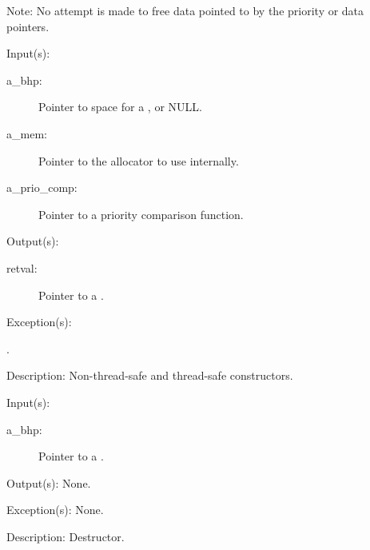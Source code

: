 \begin{capi}
\begin{capilist}
		Note: No attempt is made to free data pointed to by the priority
		or data pointers.
	\end{capilist}
\label{bhp_new}
\label{bhp_new_r}
	\begin{capilist}
	\item[Input(s): ]
		\begin{description}\item[]
		\item[a\_bhp: ]
			Pointer to space for a , or NULL.
		\item[a\_mem: ]
			Pointer to the allocator to use internally.
		\item[a\_prio\_comp: ]
			Pointer to a priority comparison function.
		\end{description}
	\item[Output(s): ]
		\begin{description}\item[]
		\item[retval: ]
			Pointer to a .
		\end{description}
	\item[Exception(s): ]
		\begin{description}\item[]
		\item[.]
		\end{description}
	\item[Description: ]
		Non-thread-safe and thread-safe constructors.
	\end{capilist}
\label{bhp_delete}
	\begin{capilist}
	\item[Input(s): ]
		\begin{description}\item[]
		\item[a\_bhp: ]
			Pointer to a \classname{bhp}.
		\end{description}
	\item[Output(s): ] None.
	\item[Exception(s): ] None.
	\item[Description: ]
		Destructor.

\end{capilist}
\end{capi}
